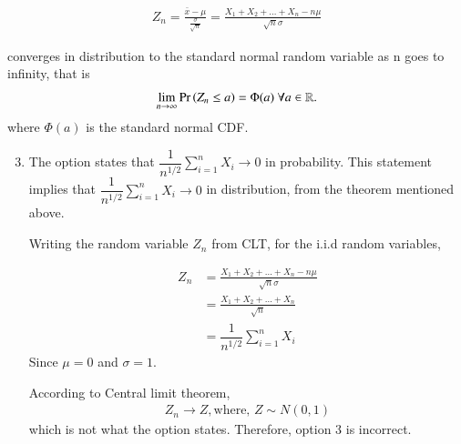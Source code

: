 \documentclass[journal,12pt,twocolumn]{IEEEtran}
\begin{document}
\begin{align}
    Z_n = \frac{\bar{x} - \mu}{\frac{\sigma}{\sqrt{n}}} = \frac{X_1 + X_2 + \ldots + X_n - n\mu}{\sqrt{n}\sigma}
\end{align}

converges in distribution to the standard normal random variable as n goes to infinity, that is
\begin{align}
    \lim_{n \to \infty}\Pr\left(Z_n \leq a\right) = \Phi(a)   \text{        }\forall a \in \mathbb{R}.
\end{align}
where $\Phi(a)$ is the standard normal CDF.

\begin{enumerate}
\setcounter{enumi}{2}
    
\item The option states that
\begin{math}
 \dfrac{1}{n^{1/2}} \sum_{i=1}^n X_i \to 0
\end{math} 
in probability. This statement implies that $\dfrac{1}{n^{1/2}} \sum_{i=1}^n X_i \to 0$ in distribution, from the theorem mentioned above.

Writing the random variable $Z_n$ from CLT, for the i.i.d random variables,

    \begin{align}
        Z_n &= \frac{X_1 + X_2 + \ldots + X_n - n\mu}{\sqrt{n}\sigma}\\
        &= \frac{X_1 + X_2 + \ldots + X_n}{\sqrt{n}}\\
        &= \dfrac{1}{n^{1/2}} \sum_{i=1}^n X_i
    \end{align}
Since $\mu = 0$ and $\sigma = 1$.

According to Central limit theorem, 
\begin{align}
    Z_n \to Z, \text{where, } Z \sim N(0,1)
\end{align}
which is not what the option states. Therefore, option 3 is incorrect.
\end{enumerate}
\end{document}
